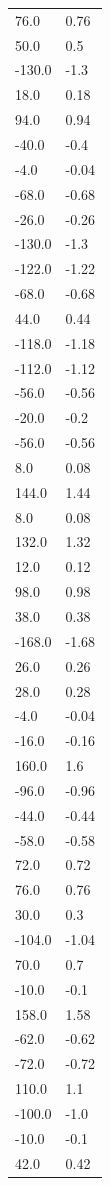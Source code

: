 \begin{longtable}{ll}
76.0 & 0.76 \\
50.0 & 0.5 \\
-130.0 & -1.3 \\
18.0 & 0.18 \\
94.0 & 0.94 \\
-40.0 & -0.4 \\
-4.0 & -0.04 \\
-68.0 & -0.68 \\
-26.0 & -0.26 \\
-130.0 & -1.3 \\
-122.0 & -1.22 \\
-68.0 & -0.68 \\
44.0 & 0.44 \\
-118.0 & -1.18 \\
-112.0 & -1.12 \\
-56.0 & -0.56 \\
-20.0 & -0.2 \\
-56.0 & -0.56 \\
8.0 & 0.08 \\
144.0 & 1.44 \\
8.0 & 0.08 \\
132.0 & 1.32 \\
12.0 & 0.12 \\
98.0 & 0.98 \\
38.0 & 0.38 \\
-168.0 & -1.68 \\
26.0 & 0.26 \\
28.0 & 0.28 \\
-4.0 & -0.04 \\
-16.0 & -0.16 \\
160.0 & 1.6 \\
-96.0 & -0.96 \\
-44.0 & -0.44 \\
-58.0 & -0.58 \\
72.0 & 0.72 \\
76.0 & 0.76 \\
30.0 & 0.3 \\
-104.0 & -1.04 \\
70.0 & 0.7 \\
-10.0 & -0.1 \\
158.0 & 1.58 \\
-62.0 & -0.62 \\
-72.0 & -0.72 \\
110.0 & 1.1 \\
-100.0 & -1.0 \\
-10.0 & -0.1 \\
42.0 & 0.42 \\

\end{longtable}
